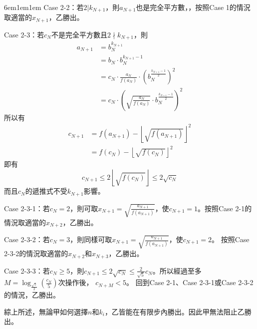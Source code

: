 \documentclass[12pt]{article}
\def\Ap{1em}
\begin{document}
\begin{mybox}[Answer]{6em}{1em}{\Ap}
    Case 2-2：若$2|k_{N+1}$，則$a_{N+1}$也是完全平方數，，按照Case 1的情況取適當的$x_{N+1}$，乙勝出。
    
    Case 2-3：若$c_N$不是完全平方數且$2\nmid k_{N+1}$，則
    \begin{align*}
        a_{N+1}&=b_N^{k_{N+1}}\\
        &=b_N\cdot b_N^{k_{N+1}-1}\\
        &=c_N\cdot \frac{a_N}{f\left(a_N\right)}\cdot \left(b_N^{\frac{k_{N+1}-1}{2}}\right)^2\\
        &=c_N\cdot \left(\sqrt{\frac{a_N}{f\left(a_N\right)}}\cdot b_N^{\frac{k_{N+1}-1}{2}}\right)^2
    \end{align*}
    所以有
    \begin{align*}
        c_{N+1}&=f\left(a_{N+1}\right) - \left\lfloor\sqrt{f\left(a_{N+1}\right)}\right\rfloor^2\\
        &=f\left(c_N\right) - \left\lfloor\sqrt{f\left(c_N\right)}\right\rfloor^2
    \end{align*}
    即有
    $$
        c_{N+1}\leq 2\left\lfloor\sqrt{f\left(c_N\right)}\right\rfloor\leq 2\sqrt{c_N}
    $$
    而且$c_N$的遞推式不受$k_{N+1}$影響。

    Case 2-3-1：若$c_N=2$，則可取$x_{N+1}=\sqrt{\frac{a_{N+1}}{f\left(a_{N+1}\right)}}$，使$c_{N+1}=1$。按照Case 2-1的情況取適當的$x_{N+2}$，乙勝出。

    Case 2-3-2：若$c_N=3$，則同樣可取$x_{N+1}=\sqrt{\frac{a_{N+1}}{f\left(a_{N+1}\right)}}$，使$c_{N+1}=2$。
    按照Case 2-3-2的情況取適當的$x_{N+2}$和$x_{N+3}$，乙勝出。

    Case 2-3-3：若$c_N\geq 5$，則$c_{N+1}\leq 2\sqrt{c_N}\leq\frac{2}{\sqrt{5}}c_N$。所以經過至多$M=\log_{\frac{\sqrt{5}}{2}}{\left(\frac{c_N}{5}\right)}$次操作後，
    $c_{N+M}<5$。
    回到Case 2-1、Case 2-3-1或Case 2-3-2的情況，乙勝出。

    綜上所述，無論甲如何選擇$n$和$k_i$，乙皆能在有限步內勝出。因此甲無法阻止乙勝出。
\end{mybox}
\end{document}
